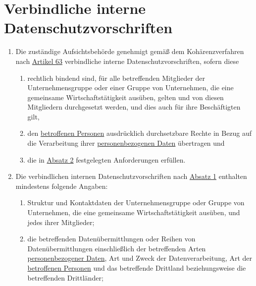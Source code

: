 \chapter{Verbindliche interne Datenschutzvorschriften}
\label{ch:47}


\begin{enumerate}

  \item Die zuständige Aufsichtsbehörde genehmigt gemäß dem Kohärenzverfahren nach \hyperref[ch:63]{Artikel 63}
   verbindliche interne Datenschutzvorschriften, sofern diese
  \label{itm:47-1}

  \begin{enumerate}
  
    \item rechtlich bindend sind, für alle betreffenden Mitglieder der Unternehmensgruppe oder einer Gruppe von
     Unternehmen, die eine gemeinsame Wirtschaftstätigkeit ausüben, gelten und von diesen Mitgliedern durchgesetzt
     werden, und dies auch für ihre Beschäftigten gilt,
    \label{itm:47-1a}

    \item den \hyperref[itm:04-1]{betroffenen Personen} ausdrücklich durchsetzbare Rechte in Bezug auf die Verarbeitung ihrer
     \hyperref[itm:04-1]{personenbezogenen Daten} übertragen und
    \label{itm:47-1b}

    \item die in \hyperref[itm:47-2]{Absatz 2} festgelegten Anforderungen erfüllen.
    \label{itm:47-1c}

  \end{enumerate}

  \item Die verbindlichen internen Datenschutzvorschriften nach \hyperref[itm:47-1]{Absatz 1} enthalten mindestens
   folgende Angaben:
  \label{itm:47-2}

  \begin{enumerate}
  
    \item Struktur und Kontaktdaten der Unternehmensgruppe oder Gruppe von Unternehmen, die eine gemeinsame
     Wirtschaftstätigkeit ausüben, und jedes ihrer Mitglieder;
    \label{itm:4722a}

    \item die betreffenden Datenübermittlungen oder Reihen von Datenübermittlungen einschließlich der betreffenden Arten
     \hyperref[itm:04-1]{personenbezogener Daten}, Art und Zweck der Datenverarbeitung, Art der \hyperref[itm:04-1]{betroffenen Personen} und das betreffende
     Drittland beziehungsweise die betreffenden Drittländer;
    \label{itm:47-2b}


\end{enumerate}
\end{enumerate}
